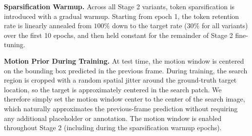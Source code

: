 \textbf{Sparsification Warmup.}
Across all Stage 2 variants, token sparsification is introduced with a gradual warmup.
Starting from epoch 1, the token retention rate is linearly annealed from $100\%$ down to the target rate (30\% for all variants) over the first 10 epochs, and then held constant for the remainder of Stage 2 fine-tuning.

\textbf{Motion Prior During Training.}
At test time, the motion window is centered on the bounding box predicted in the previous frame.
During training, the search region is cropped with a random spatial jitter around the ground-truth target location, so the target is approximately centered in the search patch.
We therefore simply set the motion window center to the center of the search image, which naturally approximates the previous-frame prediction without requiring any additional placeholder or annotation.
The motion window is enabled throughout Stage 2 (including during the sparsification warmup epochs).




